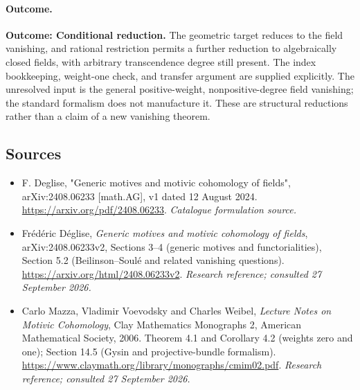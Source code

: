 \documentclass[11pt,a4paper]{article}
\numberwithin{equation}{section}
\begin{document}
\paragraph{Outcome.}
\textbf{Outcome: Conditional reduction.}
The geometric target reduces to the field vanishing, and rational restriction permits a further reduction to algebraically closed fields, with arbitrary transcendence degree still present. The index bookkeeping, weight-one check, and transfer argument are supplied explicitly. The unresolved input is the general positive-weight, nonpositive-degree field vanishing; the standard formalism does not manufacture it. These are structural reductions rather than a claim of a new vanishing theorem.

\subsection{Sources}
\begin{itemize}\raggedright
\item[\textnormal{[S1]}]\hypertarget{source:statement:1}{} F. Deglise, "Generic motives and motivic cohomology of fields", arXiv:2408.06233 [math.AG], v1 dated 12 August 2024.
\url{https://arxiv.org/pdf/2408.06233}.
{\small\textit{Catalogue formulation source.}}
\item[\textnormal{[E1]}]\hypertarget{extra:statement:1}{} Fr\'ed\'eric D\'eglise, \emph{Generic motives and motivic cohomology of fields}, arXiv:2408.06233v2, Sections 3--4 (generic motives and functorialities), Section 5.2 (Beilinson--Soul\'e and related vanishing questions).
\url{https://arxiv.org/html/2408.06233v2}.
{\small\textit{Research reference; consulted 27 September 2026.}}
\item[\textnormal{[E2]}]\hypertarget{extra:statement:2}{} Carlo Mazza, Vladimir Voevodsky and Charles Weibel, \emph{Lecture Notes on Motivic Cohomology}, Clay Mathematics Monographs 2, American Mathematical Society, 2006. Theorem 4.1 and Corollary 4.2 (weights zero and one); Section 14.5 (Gysin and projective-bundle formalism).
\url{https://www.claymath.org/library/monographs/cmim02.pdf}.
{\small\textit{Research reference; consulted 27 September 2026.}}
\end{itemize}
\end{document}
